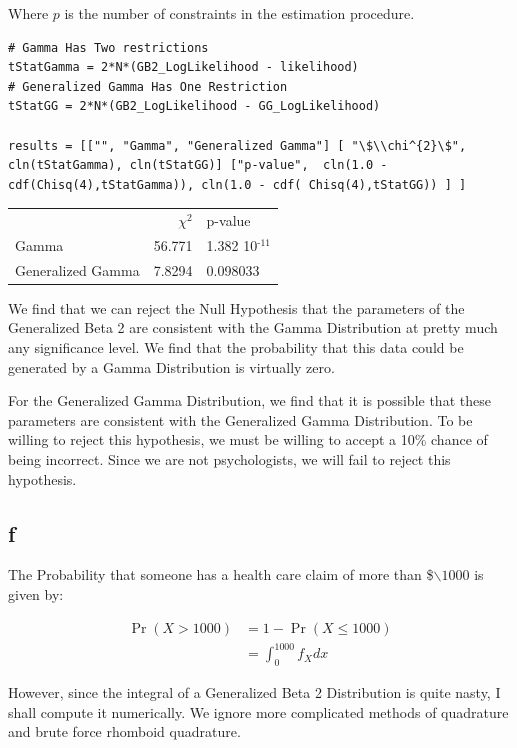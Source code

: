 \documentclass[12pt, letterpaper]{paper}
\begin{document}
Where \(p\) is the number of constraints in the estimation procedure. 
\begin{verbatim}
# Gamma Has Two restrictions
tStatGamma = 2*N*(GB2_LogLikelihood - likelihood)
# Generalized Gamma Has One Restriction
tStatGG = 2*N*(GB2_LogLikelihood - GG_LogLikelihood)

results = [["", "Gamma", "Generalized Gamma"] [ "\$\\chi^{2}\$", cln(tStatGamma), cln(tStatGG)] ["p-value",  cln(1.0 - cdf(Chisq(4),tStatGamma)), cln(1.0 - cdf( Chisq(4),tStatGG)) ] ]
\end{verbatim}

\begin{center}
\begin{tabular}{lrl}
 & \(\chi^{2}\) & p-value\\
Gamma & 56.771 & 1.382 \texttimes{} 10\(^{\text{-11}}\)\\
Generalized Gamma & 7.8294 & 0.098033\\
\end{tabular}
\end{center}

We find that we can reject the Null Hypothesis that the parameters of
the Generalized Beta 2 are consistent with the Gamma Distribution at
pretty much any significance level. We find that the probability that
this data could be generated by a Gamma Distribution is virtually
zero.

For the Generalized Gamma Distribution, we find that it is possible
that these parameters are consistent with the Generalized Gamma
Distribution. To be willing to reject this hypothesis, we must be
willing to accept a 10\% chance of being incorrect. Since we are not
psychologists, we will fail to reject this hypothesis.

\subsection{f}
\label{sec:orgcb22e3b}
The Probability that someone has a health care claim of more than
\$$\backslash$\(1000\) is given by:

\begin{align*}
  \Pr( X > 1000) &= 1 - \Pr( X \leq 1000)\\
                 &= \int_0^{1000}f_Xdx
\end{align*}

However, since the integral of a Generalized Beta 2 Distribution is
quite nasty, I shall compute it numerically. We ignore more
complicated methods of quadrature and brute force rhomboid
quadrature. 
\end{document}
